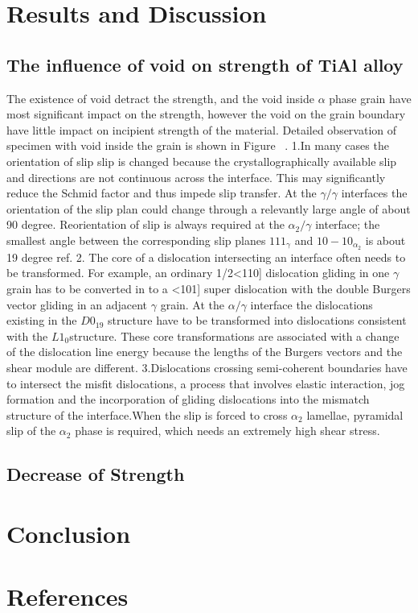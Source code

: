 \documentclass[review]{elsarticle}
\begin{document}
\section{Results and Discussion}
\subsection{The influence of void on strength of TiAl alloy}
The existence of void detract the strength, and the void inside $\alpha$ phase grain have most significant  impact on the strength, however the void on the grain boundary have little impact on incipient strength of the material. Detailed observation of specimen with void inside the grain is shown in Figure ~\cite{fig:processia}.
1.In many cases the orientation of slip slip is changed because the crystallographically available slip and directions are not continuous across the interface. This may significantly reduce the Schmid factor and thus impede slip transfer. At the $\gamma/\gamma$ interfaces the orientation of the slip plan could change through a relevantly large angle of about 90 degree. Reorientation of slip is always required at the $\alpha_{2} / \gamma$ interface; the smallest angle between the corresponding slip planes ${1 1 1 }_{\gamma}$ and ${ 1 0 -1 0}_{\alpha_2}$ is about 19 degree ref{}.
2. The core of  a dislocation intersecting an interface often needs to be transformed. For example, an ordinary 1/2<110] dislocation gliding in one $\gamma$ grain has to be converted in to a <101] super dislocation with the double Burgers vector gliding in an adjacent $\gamma$ grain. At the $\alpha/\gamma$ interface the dislocations existing in the $D0_{19}$ structure have to be transformed into dislocations consistent with the $L1_0$structure. These core transformations are associated with a change of the dislocation line energy because the lengths of the Burgers vectors and the shear module are different.
3.Dislocations crossing semi-coherent boundaries have to intersect the misfit dislocations, a process that involves elastic interaction, jog formation and the incorporation of gliding dislocations into the mismatch structure of the interface.When the slip is forced to cross $\alpha_2$ lamellae, pyramidal slip of the $\alpha_2$ phase is required, which needs an extremely high shear stress.


\subsection{Decrease of Strength}
\section{Conclusion}


\section*{References}

\end{document}
